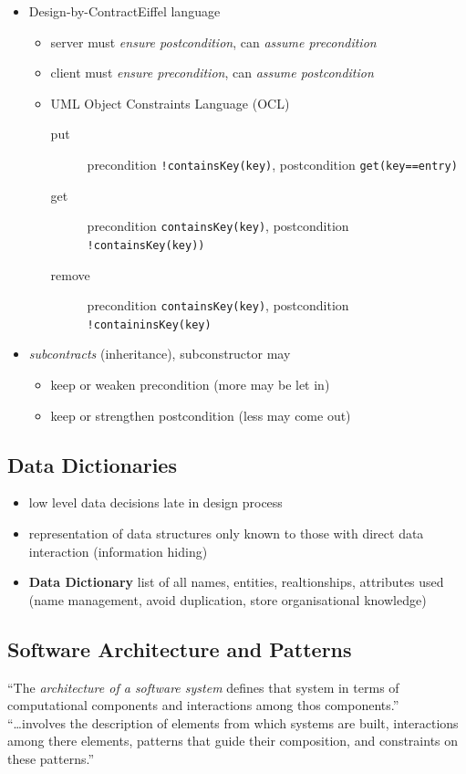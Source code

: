 \documentclass[a4paper, 10pt]{article}
\begin{document}
\begin{itemize}
\begin{itemize}
\begin{description}
		\end{description}
 	\end{itemize}
 	\item Design-by-Contract\texttrademark \follows Eiffel language
 	\begin{itemize}
 		\item server must \emph{ensure postcondition}, can \emph{assume precondition}
 		\item client must \emph{ensure precondition}, can \emph{assume postcondition}
 		\item UML Object Constraints Language (OCL) \\
 		
 		\begin{description}
 			\item[put] precondition \texttt{!containsKey(key)}, postcondition \texttt{get(key==entry)}
 			\item[get] precondition \texttt{containsKey(key)}, postcondition \texttt{!containsKey(key))}
 			\item[remove] precondition \texttt{containsKey(key)}, postcondition \texttt{!containinsKey(key)}
 		\end{description}
 	\end{itemize}
 	\item \emph{subcontracts} (inheritance), subconstructor may
 	\begin{itemize}
 		\item keep or weaken precondition (more may be let in)
 		\item keep or strengthen postcondition (less may come out)
 	\end{itemize}
 \end{itemize}

\subsection{Data Dictionaries}
\begin{itemize}
	\item low level data decisions \follows late in design process
	\item representation of data structures only known to those with direct data interaction (information hiding)
	\item \textbf{Data Dictionary} list of all names, entities, realtionships, attributes used (name management, avoid duplication, store organisational knowledge)
\end{itemize}

\subsection{Software Architecture and Patterns}
\begin{shaded}
``The \emph{architecture of a software system} defines that system in terms of computational components and interactions among thos components.'' \\
``\dots involves the description of elements from which systems are built, interactions among there elements, patterns that guide their composition, and constraints on these patterns.''
\end{shaded}
\end{document}
